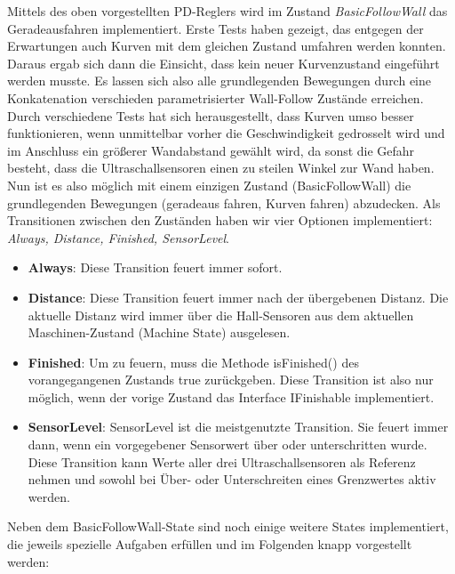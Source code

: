 Mittels des oben vorgestellten PD-Reglers wird im Zustand \textit{BasicFollowWall} das Geradeausfahren implementiert. Erste Tests haben gezeigt, das entgegen der Erwartungen auch Kurven mit dem gleichen Zustand umfahren werden konnten. Daraus ergab sich dann die Einsicht, dass kein neuer Kurvenzustand eingeführt werden musste. Es lassen sich also alle grundlegenden Bewegungen durch eine Konkatenation verschieden parametrisierter Wall-Follow Zustände erreichen. Durch verschiedene Tests hat sich herausgestellt, dass Kurven umso besser funktionieren, wenn unmittelbar vorher die Geschwindigkeit gedrosselt wird und im Anschluss ein größerer Wandabstand gewählt wird, da sonst die Gefahr besteht, dass die Ultraschallsensoren einen zu steilen Winkel zur Wand haben. 
Nun ist es also möglich mit einem einzigen Zustand (BasicFollowWall) die grundlegenden Bewegungen (geradeaus fahren, Kurven fahren) abzudecken. Als Transitionen zwischen den Zuständen haben wir vier Optionen implementiert: \textit{Always, Distance, Finished, SensorLevel}. 
\begin{itemize}
	\item \textbf{Always}: Diese Transition feuert immer sofort.
	\item \textbf{Distance}: Diese Transition feuert immer nach der übergebenen Distanz. Die aktuelle Distanz wird immer über die Hall-Sensoren aus dem aktuellen Maschinen-Zustand (Machine State) ausgelesen. 
	\item \textbf{Finished}: Um zu feuern, muss die Methode isFinished() des vorangegangenen Zustands true zurückgeben. Diese Transition ist also nur möglich, wenn der vorige Zustand das Interface IFinishable implementiert. 
	\item \textbf{SensorLevel}:	SensorLevel ist die meistgenutzte Transition. Sie feuert immer dann, wenn ein vorgegebener Sensorwert über oder unterschritten wurde. Diese Transition kann Werte aller drei Ultraschallsensoren als Referenz nehmen und sowohl bei Über- oder Unterschreiten eines Grenzwertes aktiv werden. 
\end{itemize}
Neben dem BasicFollowWall-State sind noch einige weitere States implementiert, die jeweils spezielle Aufgaben erfüllen und im Folgenden knapp vorgestellt werden:
